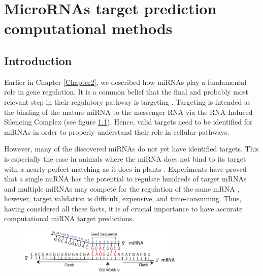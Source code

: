 
\chapter{MicroRNAs target prediction computational methods} %

\label{Chapter3} %



\section{Introduction}
Earlier in Chapter \ref{Chapter2}, we described how miRNAs play a fundamental role in gene regulation. It is a common belief that the final and probably most relevant step in their regulatory pathway is targeting \cite{computational_methods}. Targeting is intended as the binding of the mature miRNA to the messenger RNA via the RNA Induced Silencing Complex (see figure \ref{fig:mirna_binding}). Hence, valid targets need to be identified for miRNAs in order to properly understand their role in cellular pathways. 

However, many of the discovered miRNAs do not yet have identified targets. This is especially the case in animals where the miRNA does not bind to its target with a nearly perfect matching as it does in plants \cite{perfect_matching}. Experiments have proved that a single miRNA has the potential to regulate hundreds of target mRNAs and multiple miRNAs may compete for the regulation of the same mRNA \cite{multiple_binds}, however, target validation is difficult, expensive, and time-consuming. Thus, having considered all these facts, it is of crucial importance to have accurate computational miRNA target predictions.

\begin{figure}[hbt!]
	\centering
	\includegraphics[width=0.7\textwidth]{Figures/seed_match}
	\caption{}
	\label{fig:mirna_binding}
\end{figure}



